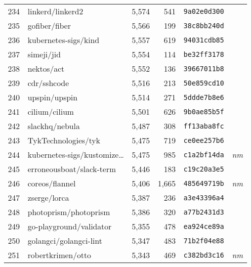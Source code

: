 {\begin{supertabular}{llrrll}
        234 &                   linkerd/linkerd2 &  5,574 &    541 &  \texttt{9a02e0d300} &              \\
        235 &                      gofiber/fiber &  5,566 &    199 &  \texttt{38c8bb240d} &              \\
        236 &               kubernetes-sigs/kind &  5,557 &    619 &  \texttt{94031cdb85} &              \\
        237 &                         simeji/jid &  5,554 &    114 &  \texttt{be32ff3178} &              \\
        238 &                         nektos/act &  5,552 &    136 &  \texttt{39667011b8} &              \\
        239 &                        cdr/sshcode &  5,516 &    213 &  \texttt{50e859cd10} &              \\
        240 &                      upspin/upspin &  5,514 &    271 &  \texttt{5ddde7b8e6} &              \\
        241 &                      cilium/cilium &  5,501 &    626 &  \texttt{9b0ae85b5f} &              \\
        242 &                     slackhq/nebula &  5,487 &    308 &  \texttt{ff13aba8fc} &              \\
        243 &                TykTechnologies/tyk &  5,475 &    719 &  \texttt{ce0ee257b6} &              \\
        244 &    kubernetes-sigs/kustomize\ldots &  5,475 &    985 &  \texttt{c1a2bf14da} &  \textit{nm} \\
        245 &           erroneousboat/slack-term &  5,446 &    183 &  \texttt{c19c20a3e5} &              \\
        246 &                     coreos/flannel &  5,406 &  1,665 &  \texttt{485649719b} &  \textit{nm} \\
        247 &                       zserge/lorca &  5,387 &    236 &  \texttt{a3e43396a4} &              \\
        248 &              photoprism/photoprism &  5,386 &    320 &  \texttt{a77b2431d3} &              \\
        249 &            go-playground/validator &  5,355 &    478 &  \texttt{ea924ce89a} &              \\
        250 &             golangci/golangci-lint &  5,347 &    483 &  \texttt{71b2f04e88} &              \\
        251 &                  robertkrimen/otto &  5,343 &    469 &  \texttt{c382bd3c16} &  \textit{nm} \\

\end{supertabular}}
